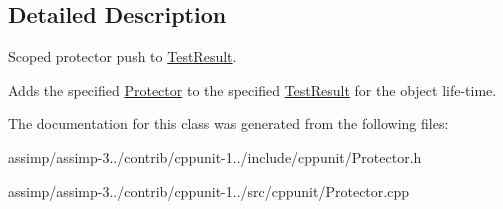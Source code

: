 \subsection{Detailed Description}
Scoped protector push to \hyperlink{class_test_result}{Test\+Result}. 

Adds the specified \hyperlink{class_protector}{Protector} to the specified \hyperlink{class_test_result}{Test\+Result} for the object life-\/time. 

The documentation for this class was generated from the following files\+:\begin{DoxyCompactItemize}
\item 
assimp/assimp-\/3../contrib/cppunit-\/1../include/cppunit/Protector.\+h\item 
assimp/assimp-\/3../contrib/cppunit-\/1../src/cppunit/Protector.\+cpp\end{DoxyCompactItemize}
